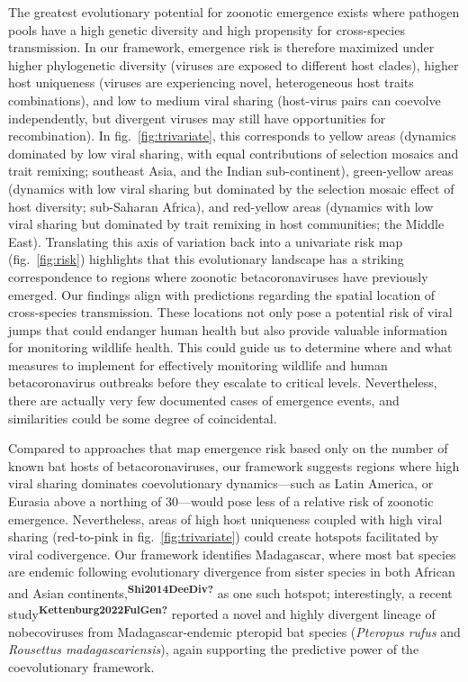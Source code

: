 \documentclass[10pt,oneside]{article}
\begin{document}
The greatest evolutionary potential for zoonotic emergence exists where
pathogen pools have a high genetic diversity and high propensity for
cross-species transmission. In our framework, emergence risk is
therefore maximized under higher phylogenetic diversity (viruses are
exposed to different host clades), higher host uniqueness (viruses are
experiencing novel, heterogeneous host traits combinations), and low to
medium viral sharing (host-virus pairs can coevolve independently, but
divergent viruses may still have opportunities for recombination). In
fig.~\ref{fig:trivariate}, this corresponds to yellow areas (dynamics
dominated by low viral sharing, with equal contributions of selection
mosaics and trait remixing; southeast Asia, and the Indian
sub-continent), green-yellow areas (dynamics with low viral sharing but
dominated by the selection mosaic effect of host diversity; sub-Saharan
Africa), and red-yellow areas (dynamics with low viral sharing but
dominated by trait remixing in host communities; the Middle East).
Translating this axis of variation back into a univariate risk map
(fig.~\ref{fig:risk}) highlights that this evolutionary landscape has a
striking correspondence to regions where zoonotic betacoronaviruses have
previously emerged. Our findings align with predictions regarding the
spatial location of cross-species transmission. These locations not only
pose a potential risk of viral jumps that could endanger human health
but also provide valuable information for monitoring wildlife health.
This could guide us to determine where and what measures to implement
for effectively monitoring wildlife and human betacoronavirus outbreaks
before they escalate to critical levels. Nevertheless, there are
actually very few documented cases of emergence events, and similarities
could be some degree of coincidental.

Compared to approaches that map emergence risk based only on the number
of known bat hosts of betacoronaviruses, our framework suggests regions
where high viral sharing dominates coevolutionary dynamics---such as
Latin America, or Eurasia above a northing of 30---would pose less of a
relative risk of zoonotic emergence. Nevertheless, areas of high host
uniqueness coupled with high viral sharing (red-to-pink in
fig.~\ref{fig:trivariate}) could create hotspots facilitated by viral
codivergence. Our framework identifies Madagascar, where most bat
species are endemic following evolutionary divergence from sister
species in both African and Asian
continents,\textsuperscript{\textbf{Shi2014DeeDiv?}} as one such
hotspot; interestingly, a recent
study\textsuperscript{\textbf{Kettenburg2022FulGen?}} reported a novel
and highly divergent lineage of nobecoviruses from Madagascar-endemic
pteropid bat species (\emph{Pteropus rufus} and \emph{Rousettus
madagascariensis}), again supporting the predictive power of the
coevolutionary framework.
\end{document}
